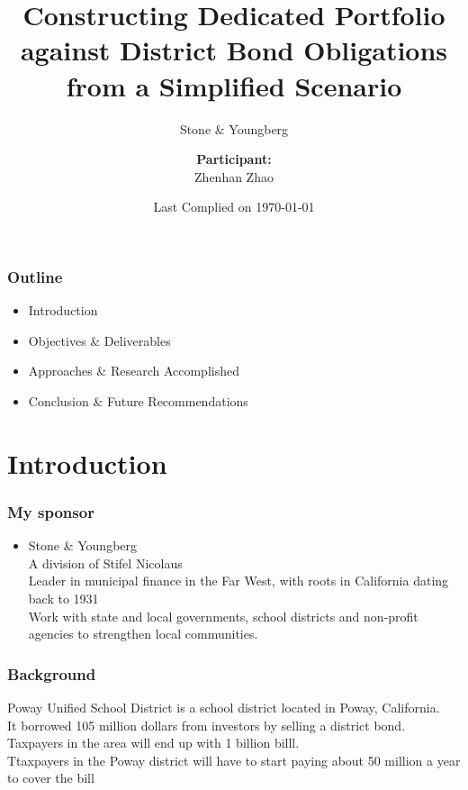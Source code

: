 \documentclass[compress,handout,10pt]{beamer}
\title{{\color{blue} \LARGE Constructing Dedicated Portfolio against District Bond Obligations from a Simplified Scenario\newline} }
\subtitle{{\color{red} \large Stone \& Youngberg  } }
\author{ 
    {\bf{Participant:}} \\ 
Zhenhan Zhao\\ 
    \vspace{5pt}
}
\institute{JHU AMS 2012 FALL}
\date{\mygreen Last Complied on \today}
\let\olditem\item
\renewcommand{\item}{\setlength{\itemsep}{0.5\baselineskip}\olditem}
\begin{document}
\begin{frame}[plain]
    \titlepage
\end{frame}

\begin{frame}
    \frametitle{Outline}
   \begin{itemize}
    \item Introduction 
    \item Objectives \& Deliverables
    \item Approaches \& Research Accomplished
    \item Conclusion \& Future Recommendations
   \end{itemize}
\end{frame}

\section{Introduction}

\begin{frame}
    \frametitle{My sponsor}
\begin{itemize}
\item  Stone \& Youngberg\\
\vspace{4mm}
A division of Stifel Nicolaus\\ 
\vspace{3mm}
Leader in municipal finance in the Far West, with roots in California dating back to 1931\\
\vspace{3mm}
Work with state and local governments, school districts and non-profit agencies to strengthen local communities.  

\end{itemize}
\end{frame}

\begin{frame}
    \frametitle{Background}
Poway Unified School District is a school district located in Poway, California.\\
\vspace{3mm}
It borrowed 105 million dollars from investors by selling a district bond.\\
Taxpayers in the area will end up with 1 billion billl. \\
\vspace{3mm}
Ttaxpayers in the Poway district will have to start paying about 50 million a year to cover the bill
\end{frame}
\end{document}
